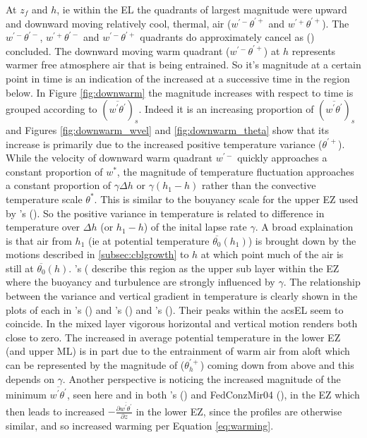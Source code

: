 At $z_{f}$ and $h$, ie within the \acs{EL} the quadrants of largest magnitude were upward and downward moving relatively cool, thermal,  air ($w^{'-}\theta^{'+}$ and $w^{'+}\theta^{'+}$). The $w^{'-}\theta^{'-}$, $w^{'+}\theta^{'-}$ and $w^{'-}\theta^{'+}$ quadrants do approximately cancel as \citeauthor{SullMoengStev} (\citeyear{SullMoengStev}) concluded. The downward moving warm quadrant ($w^{'-}\theta^{'+}$) at $h$ represents warmer free atmosphere air that is being entrained.  So it's magnitude at a certain point in time is an indication of the increased at a successive time in the region below.  In Figure \ref{fig:downwarm} the magnitude increases with respect to time is grouped according to $(\overline{w^{'}\theta^{'}})_{s}$.  Indeed it is an increasing proportion of  $(\overline{w^{'}\theta^{'}})_{s}$ and Figures \ref{fig:downwarm_wvel} and \ref{fig:downwarm_theta} show that its increase is primarily due to the increased positive temperature variance ($\theta^{'+}$).  While the velocity of downward warm quadrant $w^{'-}$ quickly approaches a constant proportion of $w^{*}$, the magnitude of temperature fluctuation approaches a constant proportion of $\gamma \Delta h$ or $\gamma (h_{1}-h)$ rather than the convective temperature scale $\theta^{*}$.  This is similar to the bouyancy scale for the upper \acs{EZ} used by \citeauthor{GarciaMellado}'s (\citeyear{GarciaMellado}). So the positive variance in temperature is related to difference in temperature over $\Delta h$ (or $h_{1} - h$) of the inital lapse rate $\gamma$.  A broad explaination is that air from $h_{1}$ (ie at potential temperature $\overline{\theta_{0}}(h_{1})$) is brought down by the motions described in \ref{subsec:cblgrowth} to $h$ at which point much of the air is still at $\overline{\theta_{0}}(h)$.  \citeauthor{GarciaMellado}'s (\citeyear{GarciaMellado} describe this region as the upper sub layer within the \acs{EZ} where the buoyancy and turbulence are strongly influenced by $\gamma$. The relationship between the variance and vertical gradient in temperature is clearly shown in the plots of each in \citeauthor{Sorbjan}'s (\citeyear{Sorbjan}) and \citeauthor{SullMoengStev}'s (\citeyear{SullMoengStev}) and \citeauthor{GarciaMellado}'s (\citeyear{GarciaMellado}). Their peaks within the acs{EL} seem to coincide.  In the mixed layer vigorous horizontal and vertical motion renders both close to zero.  The increased in average potential temperature in the lower \acs{EZ} (and upper \acs{ML}) is in part due to the entrainment of warm air from aloft which can be represented by the magnitude of ($\theta^{'+}_{h}$) coming down from above and this depends on $\gamma$. Another perspective is noticing the increased magnitude of the minimum $\overline{w^{'}\theta^{'}}$, seen here and in both \citeauthor{Sorbjan}'s (\citeyear{Sorbjan}) and {FedConzMir04} (\citeyear{FedConzMir04}), in the \acs{EZ} which then leads to increased $-\frac{\partial \overline{w^{'}\theta^{'}}}{\partial z}$ in the lower \acs{EZ}, since the profiles are otherwise similar, and so increased warming per Equation \ref{eq:warming}. \\             


